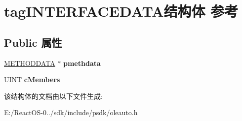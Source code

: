 \hypertarget{structtag_i_n_t_e_r_f_a_c_e_d_a_t_a}{}\section{tag\+I\+N\+T\+E\+R\+F\+A\+C\+E\+D\+A\+T\+A结构体 参考}
\label{structtag_i_n_t_e_r_f_a_c_e_d_a_t_a}
\subsection*{Public 属性}
\begin{DoxyCompactItemize}
\item 
\mbox{\label{structtag_i_n_t_e_r_f_a_c_e_d_a_t_a_abcb9bd61580bdc205bf641c441e5eb61}} 
\hyperlink{structtag_m_e_t_h_o_d_d_a_t_a}{M\+E\+T\+H\+O\+D\+D\+A\+TA} $\ast$ {\bfseries pmethdata}
\item 
\mbox{\label{structtag_i_n_t_e_r_f_a_c_e_d_a_t_a_abe6301e843b8c2ecb09d59b3c8901d05}} 
U\+I\+NT {\bfseries c\+Members}
\end{DoxyCompactItemize}


该结构体的文档由以下文件生成\+:\begin{DoxyCompactItemize}
\item 
E\+:/\+React\+O\+S-\/0../sdk/include/psdk/oleauto.\+h\end{DoxyCompactItemize}
